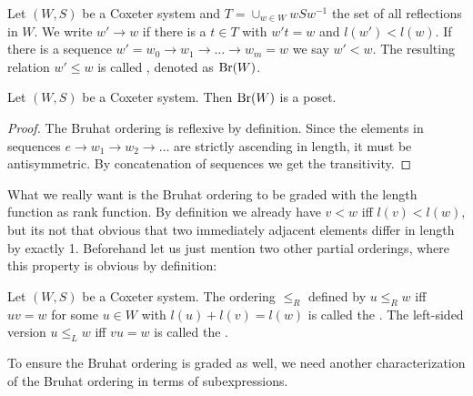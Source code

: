 \begin{defi}
	Let $(W,S)$ be a Coxeter system and $T = \cup_{w \in W} wSw^{-1}$ the set of all reflections in $W$. We write $w' \to w$ if there is a $t \in T$ with $w't = w$ and $l(w') < l(w)$. If there is a sequence $w' = w_0 \to w_1 \to \ldots \to w_m = w$ we say $w' < w$. The resulting relation $w' \leq w$ is called , denoted as $\operatorname{Br}(W)$.
\end{defi}

\begin{lemm}
	Let $(W,S)$ be a Coxeter system. Then $\operatorname{Br}(W)$ is a poset.

	\begin{proof}
		The Bruhat ordering is reflexive by definition. Since the elements in sequences $e \to w_1 \to w_2 \to \ldots$ are strictly ascending in length, it must be antisymmetric. By concatenation of sequences we get the transitivity.
	\end{proof}
\end{lemm}

What we really want is the Bruhat ordering to be graded with the length function as rank function. By definition we already have $v < w$ iff $l(v) < l(w)$, but its not that obvious that two immediately adjacent elements differ in length by exactly 1. Beforehand let us just mention two other partial orderings, where this property is obvious by definition:

\begin{defi}
	Let $(W,S)$ be a Coxeter system. The ordering $\leq_R$ defined by $u \leq_R w$ iff $uv = w$ for some $u \in W$ with $l(u) + l(v) = l(w)$ is called the . The left-sided version $u \leq_L w$ iff $vu = w$ is called the .
\end{defi}

To ensure the Bruhat ordering is graded as well, we need another characterization of the Bruhat ordering in terms of subexpressions.

